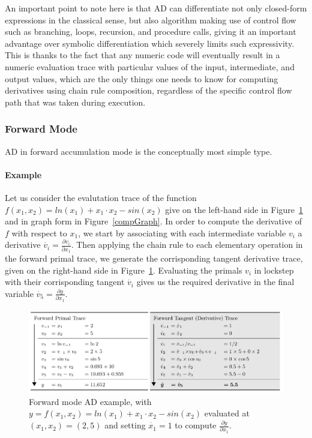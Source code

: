 \vspace*{4mm}
An important point to note here is that AD can differentiate not only closed-form expressions in the classical sense, but also algorithm making use of control flow such as branching, loops, recursion, and procedure calls, giving it an important advantage over symbolic differentiation which severely limits such expressivity. This is thanks to the fact that any numeric code will eventually result in a numeric evaluation trace with particular values of the input, intermediate, and output values, which are the only things one needs to know for computing derivatives using chain rule composition, regardless of the specific control flow path that was taken during execution.

\subsubsection{Forward Mode}
AD in forward accumulation mode is the conceptually most simple type.

\paragraph{Example}
Let us consider the evalutation trace of the function $f(x_1,x_2)= ln(x_1)+ x_1 \cdot x_2 -sin(x_2)$ give on the left-hand side in Figure~\ref{evalTrace} and in graph form in Figure~\ref{compGraph}. In order to compute the derivative of $f$ with respect to $x_1$, we start by associating with each intermediate variable $v_i$ a derivative $\dot{v_i}=\frac{\partial v_i}{\partial x_1}$. Then applying the chain rule to each elementary operation in the forward primal trace, we generate the corrisponding tangent derivative trace, given on the right-hand side in Figure~\ref{evalTrace}. Evaluating the primals $v_i$ in lockstep with their corrisponding tangent $\dot{v_i}$ gives us the required derivative in the final variable $\dot{v_5}=\frac{\partial y}{\partial x_1}$.

\begin{figure}[h!]
	\centering \includegraphics[scale=0.47]{img/evalTrace}
	\caption{Forward mode AD example, with $y=f(x_1,x_2)= ln(x_1)+ x_1 \cdot x_2 -sin(x_2)$ evaluated at $(x_1, x_2)=(2,5)$ and setting $\dot{x_1}=1$ to compute $\frac{\partial y}{\partial x_1}$.}
	\label{evalTrace}
\end{figure}

